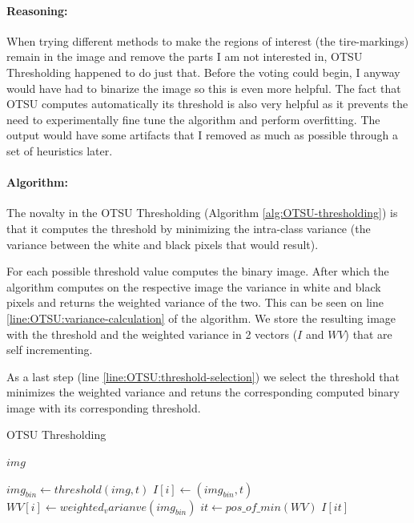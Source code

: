 \paragraph*{Reasoning:}\mbox{}\par
When trying different methods to make the regions of interest (the tire-markings) remain in the image and remove the parts I am not interested in, OTSU Thresholding happened to do just that. Before the voting could begin, I anyway would have had to binarize the image so this is even more helpful. The fact that OTSU computes automatically its threshold is also very helpful as it prevents the need to experimentally fine tune the algorithm and perform overfitting. The output would have some artifacts that I removed as much as possible through a set of heuristics later.

\paragraph*{Algorithm:}\mbox{}\par
The novalty in the OTSU Thresholding (Algorithm \ref{alg:OTSU-thresholding}) is that it computes the threshold by minimizing the intra-class variance (the variance between the white and black pixels that would result).

For each possible threshold value computes the binary image. After which the algorithm computes on the respective image the variance in white and black pixels and returns the weighted variance of the two. This can be seen on line \ref{line:OTSU:variance-calculation} of the algorithm. We store the resulting image with the threshold and the weighted variance in 2 vectors ($I$ and $WV$) that are self incrementing.

As a last step (line \ref{line:OTSU:threshold-selection}) we select the threshold that minimizes the weighted variance and retuns the corresponding computed binary image with its corresponding threshold.

\begin{algorithm}
    \caption{OTSU Thresholding}\label{alg:OTSU-thresholding}
    \begin{algorithmic}[1]
        \Require $img$

            \State $img_{bin} \gets threshold(img, t)$
            \State $I[i] \gets (img_{bin}, t)$
            \State $WV[i] \gets weighted_varianve(img_{bin})$\label{line:OTSU:variance-calculation}
        \EndFor
        \State $it \gets pos\_of\_min(WV)$\label{line:OTSU:threshold-selection}
        \State \Return $I[it]$
    \end{algorithmic}
\end{algorithm}

